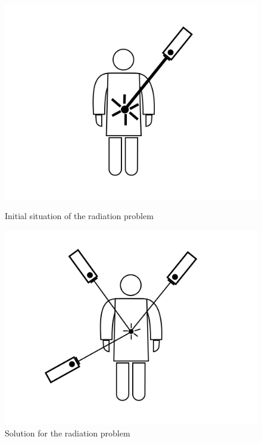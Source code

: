 \documentclass[12pt]{article}
\begin{document}
\begin{figure}[H]
    \centering
    \begin{minipage}[b]{0.45\textwidth}
    	\includegraphics[scale=0.3]{images/laser_1.png}
    	\centering
    	\caption{Initial situation of the radiation problem}
    	\label{fig:radiation_problem}
    \end{minipage}
    \hfill
    \begin{minipage}[b]{0.45\textwidth}
    	\includegraphics[scale=0.3]{images/laser_2.png}
    	\centering
    	\caption{Solution for the radiation problem}
    	\label{fig:radiation_solution}
    \end{minipage}
\end{figure}
\end{document}
